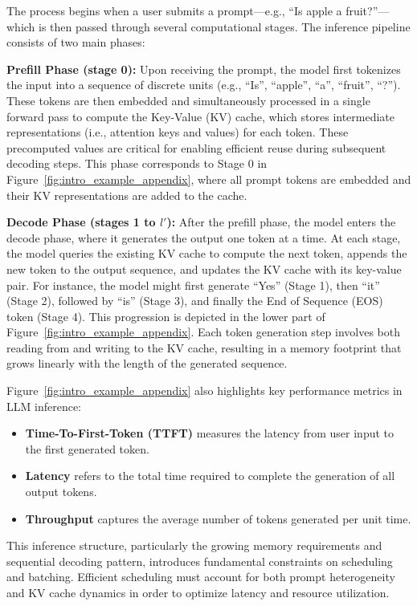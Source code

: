 \documentclass[preprint]{article}
\theoremstyle{plain}
\theoremstyle{definition}
\theoremstyle{remark}
\begin{document}
The process begins when a user submits a prompt—e.g., ``Is apple a fruit?''—which is then passed through several computational stages. The inference pipeline consists of two main phases:

\textbf{Prefill Phase (stage 0):} Upon receiving the prompt, the model first tokenizes the input into a sequence of discrete units (e.g., ``Is'', ``apple'', ``a'', ``fruit'', ``?''). These tokens are then embedded and simultaneously processed in a single forward pass to compute the Key-Value (KV) cache, which stores intermediate representations (i.e., attention keys and values) for each token. These precomputed values are critical for enabling efficient reuse during subsequent decoding steps. This phase corresponds to Stage 0 in Figure~\ref{fig:intro_example_appendix}, where all prompt tokens are embedded and their KV representations are added to the cache.

\textbf{Decode Phase (stages 1 to $l'$):} After the prefill phase, the model enters the decode phase, where it generates the output one token at a time. At each stage, the model queries the existing KV cache to compute the next token, appends the new token to the output sequence, and updates the KV cache with its key-value pair. For instance, the model might first generate ``Yes'' (Stage 1), then ``it'' (Stage 2), followed by ``is'' (Stage 3), and finally the End of Sequence (EOS) token (Stage 4). This progression is depicted in the lower part of Figure~\ref{fig:intro_example_appendix}. Each token generation step involves both reading from and writing to the KV cache, resulting in a memory footprint that grows linearly with the length of the generated sequence.

Figure~\ref{fig:intro_example_appendix} also highlights key performance metrics in LLM inference:
\begin{itemize}
\item \textbf{Time-To-First-Token (TTFT)} measures the latency from user input to the first generated token.
\item \textbf{Latency} refers to the total time required to complete the generation of all output tokens.
\item \textbf{Throughput} captures the average number of tokens generated per unit time.
\end{itemize}

This inference structure, particularly the growing memory requirements and sequential decoding pattern, introduces fundamental constraints on scheduling and batching. Efficient scheduling must account for both prompt heterogeneity and KV cache dynamics in order to optimize latency and resource utilization.
\end{document}

